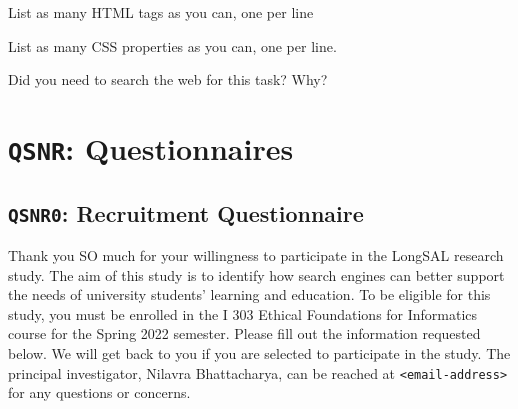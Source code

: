 \documentclass[letterpaper, nobind]{templates/ociamthesis}
\begin{document}
List as many HTML tags as you can, one per line

List as many CSS properties as you can, one per line.

Did you need to search the web for this task? Why?

\hypertarget{app-qsnr}{%
\chapter{\texorpdfstring{\texttt{QSNR}: Questionnaires}{QSNR: Questionnaires}}\label{app-qsnr}}

\hypertarget{app-qsnr0}{%
\section{\texorpdfstring{\texttt{QSNR0}: Recruitment Questionnaire}{QSNR0: Recruitment Questionnaire}}\label{app-qsnr0}}

Thank you SO much for your willingness to participate in the LongSAL research study. The aim of this study is to identify how search engines can better support the needs of university students' learning and education. To be eligible for this study, you must be enrolled in the I 303 Ethical Foundations for Informatics course for the Spring 2022 semester. Please fill out the information requested below. We will get back to you if you are selected to participate in the study. The principal investigator, Nilavra Bhattacharya, can be reached at \texttt{\textless{}email-address\textgreater{}} for any questions or concerns.
\end{document}
